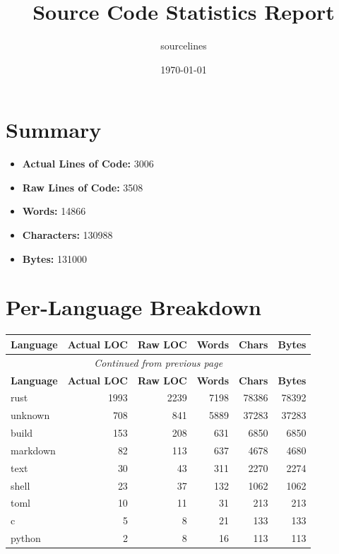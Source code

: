 \documentclass{article}
\title{Source Code Statistics Report}
\author{sourcelines}
\date{\today}
\begin{document}
\maketitle

\section{Summary}
\begin{itemize}
  \item \textbf{Actual Lines of Code:} 3006
  \item \textbf{Raw Lines of Code:} 3508
  \item \textbf{Words:} 14866
  \item \textbf{Characters:} 130988
  \item \textbf{Bytes:} 131000
\end{itemize}

\section{Per-Language Breakdown}
\begin{longtable}{l
rrrrr}
\toprule
  \textbf{Language} & \textbf{Actual LOC} & \textbf{Raw LOC} & \textbf{Words} & \textbf{Chars} & \textbf{Bytes} \\
\midrule
\endfirsthead
\multicolumn{6}{c}{\textit{Continued from previous page}} \\
\toprule
  \textbf{Language} & \textbf{Actual LOC} & \textbf{Raw LOC} & \textbf{Words} & \textbf{Chars} & \textbf{Bytes} \\
\midrule
\endhead
\bottomrule
\endfoot
\bottomrule
\endlastfoot
  rust & 1993 & 2239 & 7198 & 78386 & 78392 \\
  unknown & 708 & 841 & 5889 & 37283 & 37283 \\
  build & 153 & 208 & 631 & 6850 & 6850 \\
  markdown & 82 & 113 & 637 & 4678 & 4680 \\
  text & 30 & 43 & 311 & 2270 & 2274 \\
  shell & 23 & 37 & 132 & 1062 & 1062 \\
  toml & 10 & 11 & 31 & 213 & 213 \\
  c & 5 & 8 & 21 & 133 & 133 \\
  python & 2 & 8 & 16 & 113 & 113 \\
\end{longtable}
\end{document}
